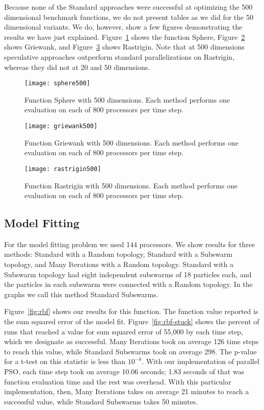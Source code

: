 \documentclass[smallcondensed]{svjour3}
\newcommand{\fig}[1]{Figure~\ref{fig:#1}}
\begin{document}
Because none of the Standard approaches were successful at optimizing the 500
dimensional benchmark functions, we do not present tables as we did for the 50
dimensional variants.  We do, however, show a few figures demonstrating the
results we have just explained.  \fig{sphere500} shows the function Sphere,
\fig{griewank500} shows Griewank, and \fig{rastrigin500} shows Rastrigin.  Note
that at 500 dimensions speculative approaches outperform standard
parallelizations on Rastrigin, whereas they did not at 20 and 50 dimensions.

\begin{figure}
  \centering
  \texttt{[image: sphere500]}
  \caption{Function Sphere with 500 dimensions.  Each method performs one
  evaluation on each of 800 processors per time step.}
  \label{fig:sphere500}
\end{figure}

\begin{figure}
  \centering
  \texttt{[image: griewank500]}
  \caption{Function Griewank with 500 dimensions.  Each method performs one
  evaluation on each of 800 processors per time step.}
  \label{fig:griewank500}
\end{figure}

\begin{figure}
  \centering
  \texttt{[image: rastrigin500]}
  \caption{Function Rastrigin with 500 dimensions.  Each method performs one
  evaluation on each of 800 processors per time step.}
  \label{fig:rastrigin500}
\end{figure}

\subsection{Model Fitting}
\label{sec:model}

For the model fitting problem we used 144 processors.  We show results for
three methods: Standard with a Random topology, Standard with a Subswarm
topology, and Many Iterations with a Random topology.  Standard with a Subswarm
topology had eight independent subswarms of 18 particles each, and the
particles in each subswarm were connected with a Random topology.  In the
graphs we call this method Standard Subswarms.

\fig{rbf} shows our results for this function.  The function value reported is
the sum squared error of the model fit.  \fig{rbf-stuck} shows the percent of
runs that reached a value for sum squared error of 55,000 by each time step,
which we designate as successful.  Many Iterations took on average 126 time
steps to reach this value, while Standard Subswarms took on average 298.  The
p-value for a t-test on this statistic is less than $10^{-8}$.  With our
implementation of parallel PSO, each time step took on average 10.06 seconds;
1.83 seconds of that was function evaluation time and the rest was overhead.
With this particular implementation, then, Many Iterations takes on average 21
minutes to reach a successful value, while Standard Subswarms takes 50 minutes.
\end{document}
